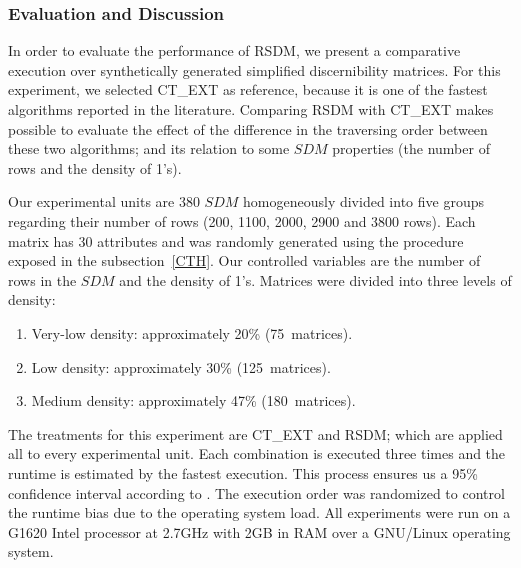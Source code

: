 \documentclass[authoryear,11pt]{elsarticle}
\begin{document}
\subsubsection{Evaluation and Discussion}
	In order to evaluate the performance of RSDM, we present a comparative execution over synthetically generated 
	simplified discernibility matrices. For this experiment, we selected CT\_EXT as reference, because it is one
	of the fastest algorithms reported in the literature. Comparing RSDM with CT\_EXT makes possible to evaluate
	the effect of the difference in the traversing order between these two algorithms; and its relation to some 
	$SDM$ properties (the number of rows and the density of 1's). 
	
	Our experimental units are 380 $SDM$ homogeneously divided into five groups regarding their number of rows (200,
	1100, 2000, 2900 and 3800 rows). Each matrix has 30 attributes and was randomly generated using the procedure
	exposed in the subsection~\ref{CTH}. Our controlled variables are the number of rows in the $SDM$ and the
	density of 1's. Matrices were divided into three levels of density:
	
	\begin{enumerate}
		\item Very-low density: approximately 20\% (75~matrices).
		\item Low density: approximately 30\% (125~matrices).
		\item Medium density: approximately 47\% (180~matrices).
	\end{enumerate}
	
	The treatments for this experiment are CT\_EXT and RSDM; which are applied all to every experimental unit. 
	Each combination is executed three times and the runtime is estimated by the fastest execution. This process 
	ensures us a 95\% confidence interval according to \cite{Haveraaen01}. The execution order was randomized to 
	control the runtime bias due to the operating system load. All experiments were run on a G1620 Intel processor 
	at 2.7GHz with 2GB in RAM over a GNU/Linux operating system.
	
\end{document}

